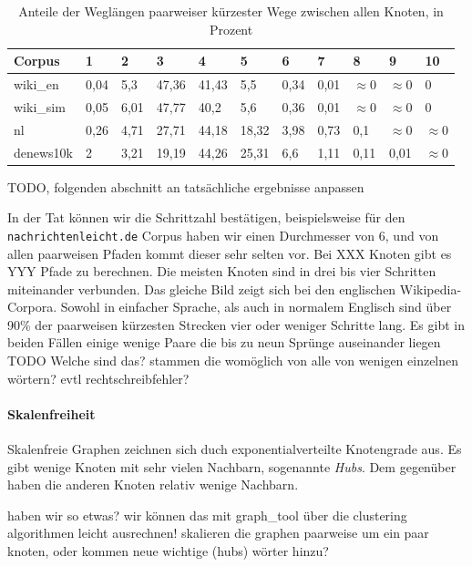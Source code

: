 \documentclass[12pt, a4paper]{article}
\begin{document}
\begin{table}[h]
  \centering
  \begin{tabular}{l|llllllllll}
    Corpus      & 1      & 2      & 3       & 4       & 5       & 6      & 7      & 8             & 9             & 10           \\
\hline
    wiki\_en    & 0,04 & 5,3  & 47,36 & 41,43 & 5,5   & 0,34 & 0,01 & $\approx$0  & $\approx$0  & 0          \\
    wiki\_sim   & 0,05 & 6,01 & 47,77 & 40,2  & 5,6   & 0,36 & 0,01 & $\approx$0  & $\approx$0  & 0          \\
    nl          & 0,26 & 4,71 & 27,71 & 44,18 & 18,32 & 3,98 & 0,73 & 0,1         & $\approx$0  & $\approx$0 \\
    denews10k   & 2    & 3,21 & 19,19 & 44,26 & 25,31 & 6,6  & 1,11 & 0,11        & 0,01        & $\approx$0 \\
  \end{tabular}
  \caption{Anteile der Weglängen paarweiser kürzester Wege zwischen allen Knoten, in Prozent}
\end{table}

TODO, folgenden abschnitt an tatsächliche ergebnisse anpassen 

In der Tat können wir die Schrittzahl bestätigen, beispielsweise für den
\texttt{nachrichtenleicht.de} Corpus haben wir einen Durchmesser von 6, und von
allen paarweisen Pfaden kommt dieser sehr selten vor. Bei XXX Knoten gibt
es YYY Pfade zu berechnen. Die meisten Knoten sind in drei bis vier Schritten
miteinander verbunden.
Das gleiche Bild zeigt sich bei den englischen Wikipedia-Corpora. Sowohl in 
einfacher Sprache, als auch in normalem Englisch sind über 90\% der paarweisen
kürzesten Strecken vier oder weniger Schritte lang. Es gibt in beiden Fällen 
einige wenige Paare die bis zu neun Sprünge auseinander liegen
TODO Welche sind das? stammen die womöglich von alle von wenigen einzelnen wörtern? evtl rechtschreibfehler? 

                             
\paragraph{Skalenfreiheit}
Skalenfreie Graphen zeichnen sich duch exponentialverteilte Knotengrade aus. Es gibt wenige Knoten mit sehr vielen Nachbarn, sogenannte \emph{Hubs}. Dem gegenüber haben die anderen Knoten relativ wenige Nachbarn. 

haben wir so etwas? wir können das mit graph\_tool über die
clustering algorithmen leicht ausrechnen!  skalieren die graphen paarweise um
ein paar knoten, oder kommen neue wichtige (hubs) wörter hinzu?
\end{document}
